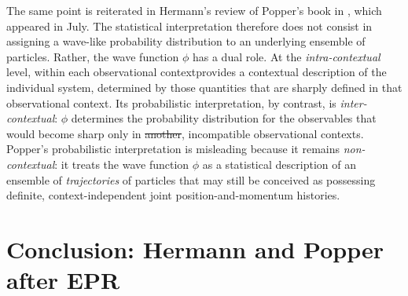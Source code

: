 \documentclass[pdflatex]{sn-jnl}
\newcommand{\OC}{observational context\xspace}
\providecommand{\DIFadd}[1]{{\protect\color{blue}\uwave{#1}}} %
\providecommand{\DIFdel}[1]{{\protect\color{red}\sout{#1}}}                      %
\providecommand{\DIFaddbegin}{} %
\providecommand{\DIFaddend}{} %
\providecommand{\DIFdelbegin}{} %
\providecommand{\DIFdelend}{} %
\begin{document}
\DIFaddend %
The same point is reiterated in Hermann’s review of Popper’s book in , which appeared in July. The statistical interpretation therefore does not consist in assigning a wave-like probability distribution to an underlying ensemble of particles. Rather, the wave function $\phi$ has a dual role. At the \emph{intra-contextual} level, within each \OC\DIFaddbegin \DIFadd{, it }\DIFaddend provides a contextual description of the individual system, determined by those quantities that are sharply defined in that observational context. Its probabilistic interpretation, by contrast, is \emph{inter-contextual}: $\phi$ determines the probability distribution for the observables that would become sharp only in \DIFdelbegin \DIFdel{another}\DIFdelend \DIFaddbegin \DIFadd{other}\DIFaddend , incompatible \OC{}s. Popper’s probabilistic interpretation is misleading because it remains \emph{non-contextual}: it treats the wave function $\phi$ as a statistical description of an ensemble of \emph{trajectories} of particles that may still be conceived as possessing definite, context-independent joint position-and-momentum histories.

\DIFdelbegin %




\DIFdelend \section{Conclusion: Hermann and Popper after EPR}
\end{document}

